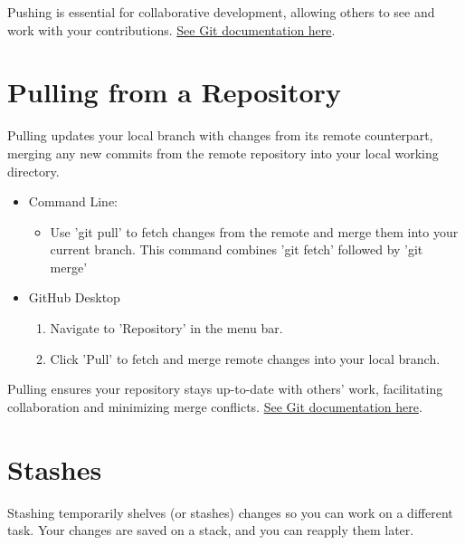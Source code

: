 \documentclass[10pt,twocolumn]{article}
\begin{document}
Pushing is essential for collaborative development, allowing others to see and work with your contributions. \hyperlink{https://git-scm.com/docs/git-push}{See Git documentation here}. \cite{GitPushDocumentation}\cite{GitGuidesPush}

\section{Pulling from a Repository}

Pulling updates your local branch with changes from its remote counterpart, merging any new commits from the remote repository into your local working directory.

\begin{itemize}
    \item Command Line: 
    \begin{itemize}
        \item  Use 'git pull' to fetch changes from the remote and merge them into your current branch. This command combines 'git fetch' followed by 'git merge' 
    \end{itemize}
    \item GitHub Desktop
    \begin{enumerate}
        \item Navigate to 'Repository' in the menu bar.
        \item Click 'Pull' to fetch and merge remote changes into your local branch.
    \end{enumerate}
    
\end{itemize}

Pulling ensures your repository stays up-to-date with others' work, facilitating collaboration and minimizing merge conflicts. \hyperlink{https://git-scm.com/docs/git-pull}{See Git documentation here}. \cite{GitPullDocumentation}\cite{GitGuidesPull}

\section{Stashes}

Stashing temporarily shelves (or stashes) changes so you can work on a different task. Your changes are saved on a stack, and you can reapply them later.
\end{document}
